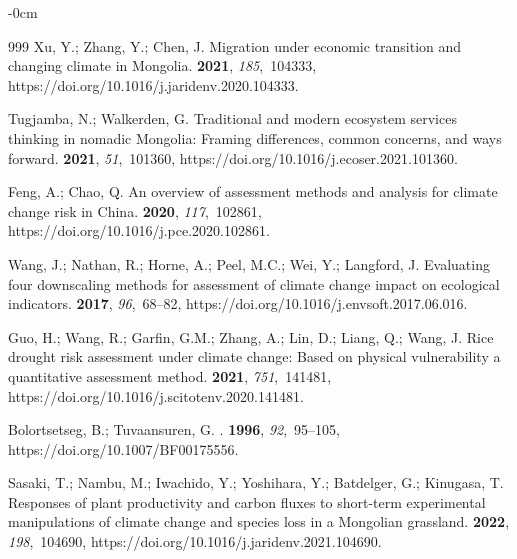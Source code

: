 \documentclass[geosciences,article,accept,pdftex,oneauthor]{Definitions/mdpi}
\begin{document}
\begin{adjustwidth}{-\extralength}{0cm}
\begin{thebibliography}{999}
Xu, Y.; Zhang, Y.; Chen, J.
\newblock Migration under economic transition and changing climate in Mongolia.
 {\bf 2021}, {\em 185},~104333, https://doi.org/10.1016/j.jaridenv.2020.104333.

Tugjamba, N.; Walkerden, G.
\newblock Traditional and modern ecosystem services thinking in nomadic
  Mongolia: Framing differences, common concerns, and ways forward.
 {\bf 2021}, {\em 51},~101360, https://doi.org/10.1016/j.ecoser.2021.101360.

Feng, A.; Chao, Q.
\newblock An overview of assessment methods and analysis for climate change
  risk in China.
 {\bf 2020},
  {\em 117},~102861, https://doi.org/10.1016/j.pce.2020.102861.

Wang, J.; Nathan, R.; Horne, A.; Peel, M.C.; Wei, Y.; Langford, J.
\newblock Evaluating four downscaling methods for assessment of climate change
  impact on ecological indicators.
 {\bf 2017}, {\em
  96},~68--82, https://doi.org/10.1016/j.envsoft.2017.06.016.

Guo, H.; Wang, R.; Garfin, G.M.; Zhang, A.; Lin, D.; Liang, Q.; Wang, J.
\newblock Rice drought risk assessment under climate change: Based on physical
  vulnerability a quantitative assessment method.
 {\bf 2021}, {\em 751},~141481, https://doi.org/10.1016/j.scitotenv.2020.141481.

Bolortsetseg, B.; Tuvaansuren, G.
.
 {\bf 1996}, {\em 92},~95--105, https://doi.org/10.1007/BF00175556.

Sasaki, T.; Nambu, M.; Iwachido, Y.; Yoshihara, Y.; Batdelger, G.; Kinugasa, T.
\newblock Responses of plant productivity and carbon fluxes to short-term
  experimental manipulations of climate change and species loss in a Mongolian
  grassland.
 {\bf 2022}, {\em 198},~104690, https://doi.org/10.1016/j.jaridenv.2021.104690.


\end{thebibliography}
\end{adjustwidth}
\end{document}
